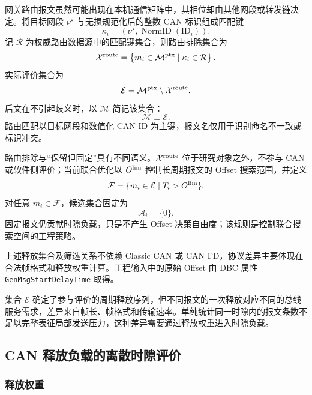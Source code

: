 \documentclass[UTF8,a4paper,twoside,zihao=-4]{ctexart}
\numberwithin{equation}{section}
\numberwithin{figure}{section}
\numberwithin{table}{section}
\theoremstyle{definition}
\newcommand{\Oset}{\mathcal{A}}
\newcommand{\Rset}{\mathcal{R}}
\newcommand{\Mset}{\mathcal{M}}
\newcommand{\Eset}{\mathcal{E}}
\newcommand{\Xset}{\mathcal{X}}
\newcommand{\Fset}{\mathcal{F}}
\numberwithin{algocf}{section}
\begin{document}
网关路由报文虽然可能出现在本机通信矩阵中，其相位却由其他网段或转发链决定。将目标网段 $\nu^\star$ 与无损规范化后的整数 CAN 标识组成匹配键
\begin{equation}
 \kappa_i=
 \left(\nu^\star,\operatorname{NormID}(\mathrm{ID}_i)\right).
\label{eq:routing-key}
\end{equation}
记 $\Rset$ 为权威路由数据源中的匹配键集合，则路由排除集合为
\begin{equation}
 \Xset^{\rm route}
 =\left\{m_i\in\Mset^{\rm ptx}\mid\kappa_i\in\Rset\right\}.
\label{eq:routed-message-set}
\end{equation}
实际评价集合为
\begin{equation}
 \Eset=\Mset^{\rm ptx}\setminus\Xset^{\rm route}.
\label{eq:routing-exclusion}
\end{equation}
后文在不引起歧义时，以 $\Mset$ 简记该集合：
\begin{equation}
 \Mset\equiv\Eset.
\label{eq:evaluation-set-alias}
\end{equation}
路由匹配以目标网段和数值化 CAN ID 为主键，报文名仅用于识别命名不一致或标识冲突。

路由排除与“保留但固定”具有不同语义。$\Xset^{\rm route}$ 位于研究对象之外，不参与 CAN 或软件侧评价；当前联合优化以 $O^{\rm lim}$ 控制长周期报文的 Offset 搜索范围，并定义
\begin{equation}
 \Fset=\{m_i\in\Eset\mid T_i>O^{\rm lim}\}.
\label{eq:fixed-long-period}
\end{equation}
对任意 $m_i\in\Fset$，候选集合固定为
\begin{equation}
 \Oset_i=\{0\}.
\label{eq:fixed-long-period-offset}
\end{equation}
固定报文仍贡献时隙负载，只是不产生 Offset 决策自由度；该规则是控制联合搜索空间的工程策略。

上述释放集合及筛选关系不依赖 Classic CAN 或 CAN FD，协议差异主要体现在合法帧格式和释放权重计算。工程输入中的原始 Offset 由 DBC 属性 \texttt{GenMsgStart\allowbreak Delay\allowbreak Time} 取得。

集合 $\Eset$ 确定了参与评价的周期释放序列，但不同报文的一次释放对应不同的总线服务需求，差异来自帧长、帧格式和传输速率。单纯统计同一时隙内的报文条数不足以完整表征局部发送压力，这种差异需要通过释放权重进入时隙负载。

\subsection{CAN 释放负载的离散时隙评价}

\subsubsection{释放权重}
\label{subsubsec:frame-payload-unit-weight}
\end{document}
